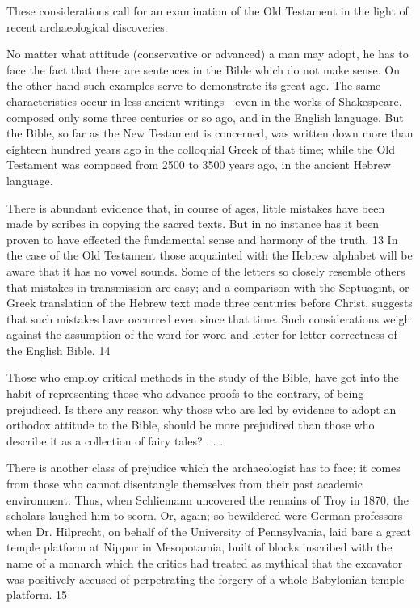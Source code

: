 These considerations call for an examination of the Old Testament in the light of recent
archaeological discoveries.

No matter what attitude (conservative or advanced) a man may adopt, he has to face the fact
that there are sentences in the Bible which do not make sense. On the other hand such
examples serve to demonstrate its great age. The same characteristics occur in less ancient
writings—even in the works of Shakespeare, composed only some three centuries or so ago,
and in the English language. But the Bible, so far as the New Testament is concerned, was
written down more than eighteen hundred years ago in the colloquial Greek of that time;
while the Old Testament was composed from 2500 to 3500 years ago, in the ancient Hebrew
language.

There is abundant evidence that, in course of ages, little mistakes have been made by scribes
in copying the sacred texts. But in no instance has it been proven to have effected the
fundamental sense and harmony of the truth. 13 In the case of the Old Testament those
acquainted with the Hebrew alphabet will be aware that it has no vowel sounds. Some of the
letters so closely resemble others that mistakes in transmission are easy; and a comparison
with the Septuagint, or Greek translation of the Hebrew text made three centuries before
Christ, suggests that such mistakes have occurred even since that time. Such considerations
weigh against the assumption of the word-for-word and letter-for-letter correctness of the
English Bible. 14

Those who employ critical methods in the study of the Bible, have got into the habit of
representing those who advance proofs to the contrary, of being prejudiced. Is there any
reason why those who are led by evidence to adopt an orthodox attitude to the Bible, should
be more prejudiced than those who describe it as a collection of fairy tales? . . .

There is another class of prejudice which the archaeologist has to face; it comes from those
who cannot disentangle themselves from their past academic environment. Thus, when
Schliemann uncovered the remains of Troy in 1870, the scholars laughed him to scorn. Or,
again; so bewildered were German professors when Dr. Hilprecht, on behalf of the
University of Pennsylvania, laid bare a great temple platform at Nippur in Mesopotamia,
built of blocks inscribed with the name of a monarch which the critics had treated as mythical
that the excavator was positively accused of perpetrating the forgery of a whole Babylonian
temple platform. 15

